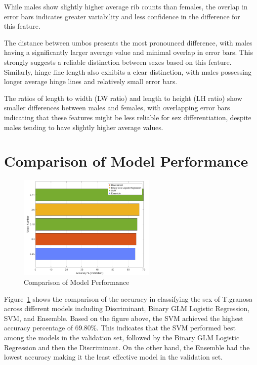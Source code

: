 While males show slightly higher average rib counts than females, the overlap in error bars indicates greater variability and less confidence in the difference for this feature.

The distance between umbos presents the most pronounced difference, with males having a significantly larger average value and minimal overlap in error bars. This strongly suggests a reliable distinction between sexes based on this feature. Similarly, hinge line length also exhibits a clear distinction, with males possessing longer average hinge lines and relatively small error bars.

The ratios of length to width (LW ratio) and length to height (LH ratio) show smaller differences between males and females, with overlapping error bars indicating that these features might be less reliable for sex differentiation, despite males tending to have slightly higher average values.

\newpage
\section{Comparison of Model Performance}

\begin{figure}[!htbp]
	\centering
	\includegraphics[width=0.6\textwidth]{figures/compare-models.png}
	\caption{Comparison of Model Performance}
	\label{fig:compare-models}
\end{figure}

Figure~\ref{fig:compare-models} shows the comparison of the accuracy in classifying the sex of T.granosa across different models including Discriminant, Binary GLM Logistic Regression, SVM, and Ensemble. Based on the figure above, the SVM achieved the highest accuracy percentage of 69.80\%. This indicates that the SVM performed best among the models in the validation set, followed by the Binary GLM Logistic Regression and then the Discriminant. On the other hand, the Ensemble had the lowest accuracy making it the least effective model in the validation set. 

